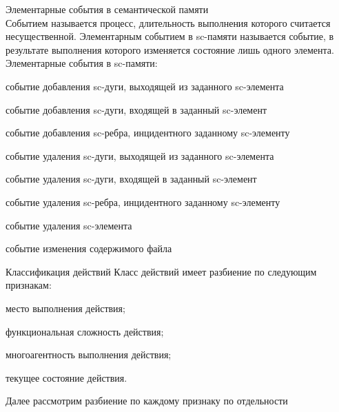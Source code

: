 \begin{frame}{Элементарные события в семантической памяти}
    \topline
    \justifying
    \vspace{30}
     \\
     
    Событием называется процесс, длительность выполнения которого считается несущественной. Элементарным событием в sc-памяти называется событие, в результате выполнения которого изменяется состояние лишь одного элемента.
    Элементарные события в sc-памяти:
    \begin{textitemize}
        \item событие добавления sc-дуги, выходящей из заданного sc-элемента
        \item событие добавления sc-дуги, входящей в заданный sc-элемент
        \item событие добавления sc-ребра, инцидентного заданному sc-элементу
        \item событие удаления sc-дуги, выходящей из заданного sc-элемента
        \item событие удаления sc-дуги, входящей в заданный sc-элемент
        \item событие удаления sc-ребра, инцидентного заданному sc-элементу
        \item событие удаления sc-элемента
        \item событие изменения содержимого файла
    \end{textitemize}
\end{frame}

\begin{frame}{Классификация действий}
\topline
    Класс действий имеет разбиение по следующим признакам:
\begin{textitemize}
	\item место выполнения действия;
	\item функциональная сложность действия;
	\item многоагентность выполнения действия;
	\item текущее состояние действия.
\end{textitemize}
Далее рассмотрим разбиение по каждому признаку по отдельности
\end{frame}

